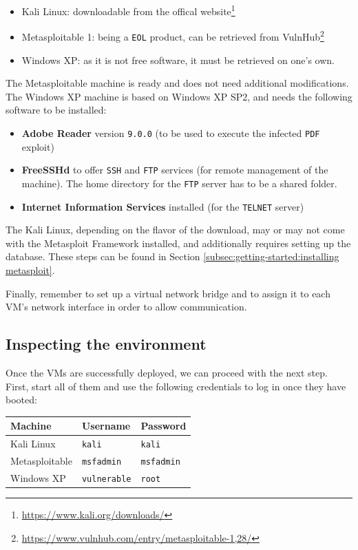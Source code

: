 \begin{itemize}
    \item Kali Linux: downloadable from the offical website\footnote{\url{https://www.kali.org/downloads/}}
    \item Metasploitable 1: being a \texttt{EOL} product, can be retrieved from VulnHub\footnote{\url{https://www.vulnhub.com/entry/metasploitable-1,28/}}
    \item Windows XP: as it is not free software, it must be retrieved on one's own.
\end{itemize}

The Metasploitable machine is ready and does not need additional  modifications. The Windows XP machine is based on Windows XP SP2, and needs the following software to be installed:

\begin{itemize}
    \item \textbf{Adobe Reader} version \texttt{9.0.0} (to be used to execute the infected \texttt{PDF} exploit)
    \item \textbf{FreeSSHd} to offer \texttt{SSH} and \texttt{FTP} services (for remote management of the machine). The home directory for the \texttt{FTP} server has to be a shared folder.
    \item \textbf{Internet Information Services} installed (for the \texttt{TELNET} server)
\end{itemize}

The Kali Linux, depending on the flavor of the download, may or may not come with the Metasploit Framework installed, and additionally requires setting up the database. These steps can be found in Section \ref{subsec:getting-started:installing metasploit}.

Finally, remember to set up a virtual network bridge and to assign it to each VM's network interface in order to allow communication.

\subsection{Inspecting the environment}

Once the VMs are successfully deployed, we can proceed with the next step. First, start all of them and use the following credentials to log in once they have booted:

\begin{table}[htbp]
\centering
\begin{tabular}{|l|l|l|}
\hline 
Machine        & Username   & Password \\
\hline 
Kali Linux     & \texttt{kali}       & \texttt{kali}     \\
Metasploitable & \texttt{msfadmin}   & \texttt{msfadmin} \\
Windows XP     & \texttt{vulnerable} & \texttt{root}     \\
\hline
\end{tabular}
\end{table}

